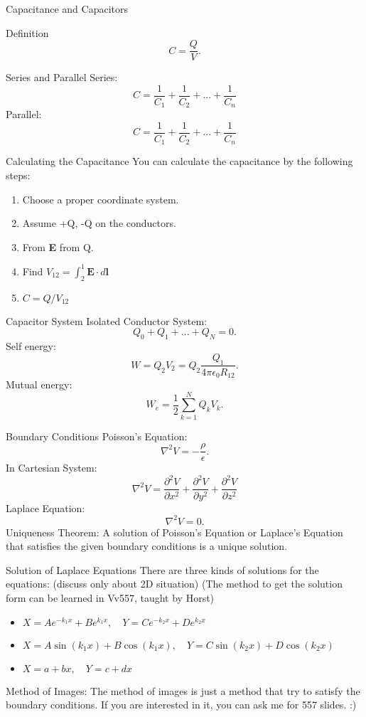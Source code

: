 \documentclass[xcolor={dvipsnames}]{beamer}
\begin{document}
\begin{frame}{Capacitance and Capacitors}
\begin{block}{Definition}
$$C=\frac{Q}{V}.$$
\end{block}
\pause
\begin{block}{Series and Parallel}
Series:
$$C=\frac{1}{C_1}+\frac{1}{C_2}+...+\frac{1}{C_n}$$
Parallel:
$$C=\frac{1}{C_1}+\frac{1}{C_2}+...+\frac{1}{C_n}$$
\end{block}
\end{frame}
\begin{frame}{Calculating the Capacitance}
You can calculate the capacitance by the following steps:
\begin{enumerate}
	\item Choose a proper coordinate system.
	\item Assume +Q, -Q on the conductors.
	\item From \textbf{E} from Q.
	\item Find $V_{12}=\int_2^1 \textbf{E}\cdot d\textbf{l}$
	\item $C=Q/V_{12}$
\end{enumerate}
\end{frame}
\begin{frame}{Capacitor System}
Isolated Conductor System:
$$Q_0+Q_1+...+Q_N=0.$$
Self energy:
$$W=Q_2V_2=Q_2\frac{Q_1}{4\pi\epsilon_0 R_{12}}.$$
Mutual energy:
$$W_e=\frac{1}{2}\sum_{k=1}^N Q_kV_k.$$
\end{frame}
\begin{frame}{Boundary Conditions}
Poisson's Equation:
$$\nabla^2 V=-\frac{\rho}{\epsilon}.$$
In Cartesian System:
$$\nabla^2 V=\frac{\partial^2 V}{\partial x^2}+\frac{\partial^2 V}{\partial y^2}+\frac{\partial^2 V}{\partial z^2}$$
Laplace Equation:
$$\nabla^2 V=0.$$
Uniqueness Theorem: A solution of Poisson’s Equation or Laplace’s Equation that satisfies the given boundary conditions is a unique solution.
\end{frame}
\begin{frame}{Solution of Laplace Equations}
There are three kinds of solutions for the equations: (discuss only about 2D situation) (The method to get the solution form can be learned in Vv557, taught by Horst)
\begin{itemize}
	\item $X=Ae^{-k_1x}+Be^{k_1x},\quad Y=Ce^{-k_2x}+De^{k_2x}$
	\item $X=A\sin(k_1x)+B\cos(k_1x),\quad Y=C\sin(k_2x)+D\cos(k_2x)$
	\item $X=a+bx,\quad Y=c+dx$
\end{itemize}
Method of Images: The method of images is just a method that try to satisfy the boundary conditions. If you are interested in it, you can ask me for 557 slides. :)
\end{frame}
\end{document}
